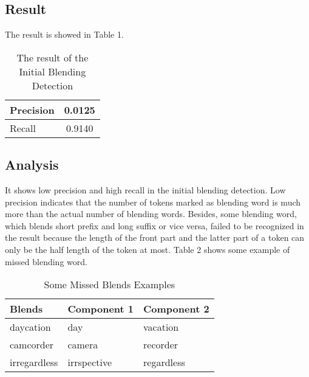 \documentclass[11pt]{article}
\begin{document}
\subsection{Result}
The result is showed in Table 1.
\begin{table}[htbp]
 \centering
 \label{table 1}
 
 \begin{tabular}{|l|c|}

  \hline
  Precision & 0.0125\\
  \hline
  Recall & 0.9140\\
  \hline
 
 \end{tabular}

\caption{The result of the Initial Blending Detection}
\end{table}

\subsection{Analysis}
It shows low precision and high recall in the initial blending detection. Low precision indicates that the number of tokens marked as blending word is much more than the actual number of blending words.  Besides, some blending word, which blends short prefix and long suffix or vice versa,  failed to be recognized in the result because the length of the front part and the latter part of a token can only be the half length of the token at most. Table 2 shows some example of missed blending word.

\begin{table}[htbp]
 \centering
 \label{table 2}
 
 \begin{tabular}{|l|l|l|}

  \hline
  Blends & Component 1 & Component 2\\
  \hline\hline
  daycation & day & vacation\\
  \hline
  camcorder& camera & recorder\\
  \hline
  irregardless & irrspective & regardless\\
  \hline
 \end{tabular}

\caption{Some Missed Blends Examples}
\end{table}
\end{document}
